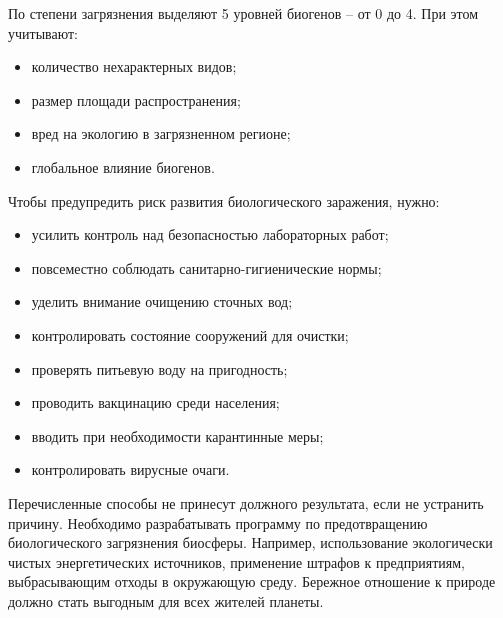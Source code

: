 \documentclass[a4paper, 12pt]{extarticle}
\begin{document}
По степени загрязнения выделяют 5 уровней биогенов – от 0 до 4. При этом учитывают:
\begin{itemize}
    \item количество нехарактерных видов;
    \item размер площади распространения;
    \item вред на экологию в загрязненном регионе;
    \item глобальное влияние биогенов.
\end{itemize}

Чтобы предупредить риск развития биологического заражения, нужно:
\begin{itemize}
    \item усилить контроль над безопасностью лабораторных работ;
    \item повсеместно соблюдать санитарно-гигиенические нормы;
    \item уделить внимание очищению сточных вод;
    \item контролировать состояние сооружений для очистки;
    \item проверять питьевую воду на пригодность;
    \item проводить вакцинацию среди населения;
    \item вводить при необходимости карантинные меры;
    \item контролировать вирусные очаги.
\end{itemize}

Перечисленные способы не принесут должного результата, если не устранить причину. Необходимо разрабатывать программу по предотвращению биологического загрязнения биосферы. Например, использование экологически чистых энергетических источников, применение штрафов к предприятиям, выбрасывающим отходы в окружающую среду. Бережное отношение к природе должно стать выгодным для всех жителей планеты.
\end{document}
